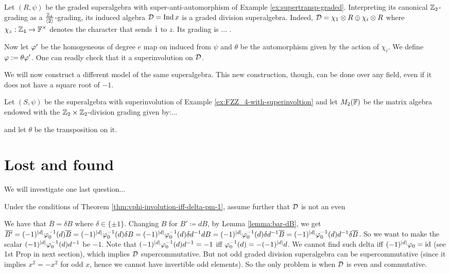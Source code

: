 \begin{ex}
    Let $(R, \psi)$ be the graded superalgebra with su\-per-an\-ti-auto\-mor\-phism of Example \ref{ex:supertransp-graded}. Interpreting its canonical $\mathbb{Z}_2$-grading as a $\frac{\mathbb{Z}_4}{\langle \bar 2 \rangle}$-grading, its induced algebra $\mathcal{D} = \operatorname{Ind} x$ is a graded division superalgebra. Indeed, $\mathcal{D} = \chi_1 \otimes R \oplus \chi_i \otimes R$ where $\chi_z: \mathbb{Z}_4 \to \mathbb{F}^\times$ denotes the character that sends $\bar 1$ to $z$. Its grading is $\ldots$ .
    
    Now let $\varphi'$ be the homogeneous of degree $e$ map on induced from $\psi$ and $\theta$ be the automorphism given by the action of $\chi_i$. We define $\varphi := \theta \varphi'$. One can readly check that it a superinvolution on $\mathcal{D}$.
\end{ex}

We will now construct a different model of the same superalgebra. This new construction, though, can be done over any field, even if it does not have a square root of $-1$.


\begin{prop}
    Let $(S, \psi)$ be the superalgebra with superinvolution of Example \ref{ex:FZZ_4-with-superinvoltion} and let $M_2(\mathbb{F})$ be the matrix algebra endowed with the $\mathbb{Z}_2 \times \mathbb{Z}_2$-division grading given by:...
    
    and let $\theta$ be the transposition on it.
\end{prop}




\section{Lost and found}

We will investigate one last question...

\begin{cor}
    Under the conditions of Theorem \ref{thm:vphi-involution-iff-delta-pm-1}, assume further that $\mathcal{D}$ is not an even 
\end{cor}

We have that $\overline B = \delta B $ where $\delta \in \{\pm 1\}$. 
Changing $B$ for $B' \coloneqq dB$, by Lemma \ref{lemma:bar-dB}, we get $\overline{B'} = (-1)^{|d|} \varphi_0^{-1} (d) \overline B = (-1)^{|d|} \varphi_0^{-1} (d) \delta B = (-1)^{|d|} \varphi_0^{-1} (d) \delta d^{-1} d B = (-1)^{|d|} \varphi_0^{-1} (d) \delta d^{-1} \overline B = (-1)^{|d|} \varphi_0^{-1} (d) d^{-1} \delta \overline B$.
So we want to make the scalar $(-1)^{|d|} \varphi_0^{-1} (d) d^{-1}$ be $-1$. 
Note that $(-1)^{|d|} \varphi_0^{-1} (d) d^{-1} = -1$ iff $\varphi_0^{-1} (d) = - (-1)^{|d|} d$. 
We cannot find such delta iff $ (-1)^{|d|} \varphi_0 = \operatorname{id}$ (see 1st Prop in next section), which implies $\mathcal{D}$ supercommutative. But not odd graded division superalgebra can be supercommutative (since it implies $x^2 = -x^2$ for odd $x$, hence we cannot have invertible odd elements). So the only problem is when $\mathcal{D}$ is even and commutative. 
    